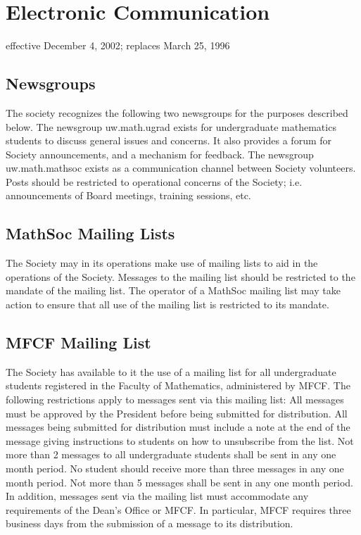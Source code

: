 \section{Electronic Communication}
effective December 4, 2002; replaces March 25, 1996

\subsection{Newsgroups}
The society recognizes the following two newsgroups for the purposes described below.
The newsgroup uw.math.ugrad exists for undergraduate mathematics students to discuss general issues and concerns. It also provides a forum for Society announcements, and a mechanism for feedback.
The newsgroup uw.math.mathsoc exists as a communication channel between Society volunteers. Posts should be restricted to operational concerns of the Society; i.e. announcements of Board meetings, training sessions, etc.

\subsection{MathSoc Mailing Lists}
The Society may in its operations make use of mailing lists to aid in the operations of the Society. Messages to the mailing list should be restricted to the mandate of the mailing list. The operator of a MathSoc mailing list may take action to ensure that all use of the mailing list is restricted to its mandate.

\subsection{MFCF Mailing List}
The Society has available to it the use of a mailing list for all undergraduate students registered in the Faculty of Mathematics, administered by MFCF. The following restrictions apply to messages sent via this mailing list:
All messages must be approved by the President before being submitted for distribution.
All messages being submitted for distribution must include a note at the end of the message giving instructions to students on how to unsubscribe from the list.
Not more than 2 messages to all undergraduate students shall be sent in any one month period.
No student should receive more than three messages in any one month period.
Not more than 5 messages shall be sent in any one month period.
In addition, messages sent via the mailing list must accommodate any requirements of the Dean’s Office or MFCF. In particular, MFCF requires three business days from the submission of a message to its distribution.